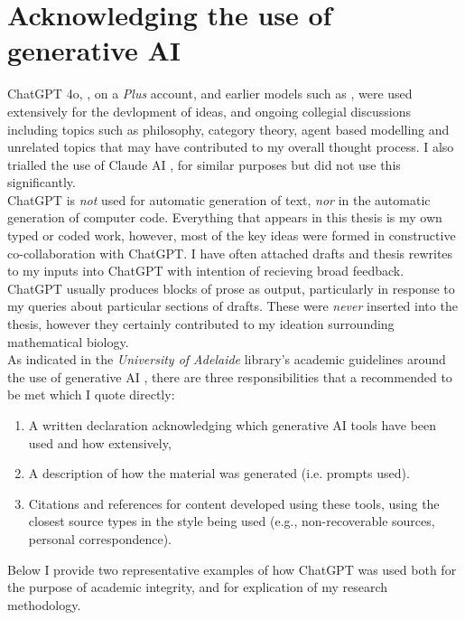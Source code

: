 \chapter{Acknowledging the use of generative AI}

ChatGPT 4o, \cite{openai2024chatgpt4o}, on a \textit{Plus} account, and earlier models such 
as \cite{openai2022chatgpt},  were used extensively for the devlopment of ideas, 
and ongoing collegial discussions including topics such as philosophy, 
category theory, agent based modelling and unrelated topics that may have contributed
to my overall thought process. I also trialled 
the use of Claude AI \cite{anthropic2024claude}, for similar purposes but did not 
use this significantly. 
\\

ChatGPT is \textit{not} used for automatic generation of text, \textit{nor} in the automatic 
generation of computer code. Everything that appears
in this thesis is my own typed or coded work, however,
most of the key ideas were formed in constructive co-collaboration with ChatGPT.
I have often attached drafts and thesis rewrites to my inputs 
into ChatGPT with intention of recieving broad feedback. ChatGPT usually produces
blocks of prose as output, particularly in response to
my queries about particular sections of drafts. 
These were \textit{never} inserted into the thesis, however 
they certainly contributed to my ideation surrounding mathematical biology.
\\

As indicated in the \textit{University of Adelaide} library's academic guidelines 
around the use of generative AI \cite{university2025academic}, there are three 
responsibilities that a recommended to be met which I quote directly:
\begin{enumerate}
    \item A written declaration acknowledging which generative AI tools have been used and how extensively,
    \item A description of how the material was generated (i.e. prompts used).
    \item Citations and references for content developed using these tools, 
    using the closest source types in the style being used (e.g., non-recoverable sources, personal correspondence).
\end{enumerate}

Below I provide two representative examples of how ChatGPT was used 
both for the purpose of academic integrity, and for explication of 
my research methodology.

